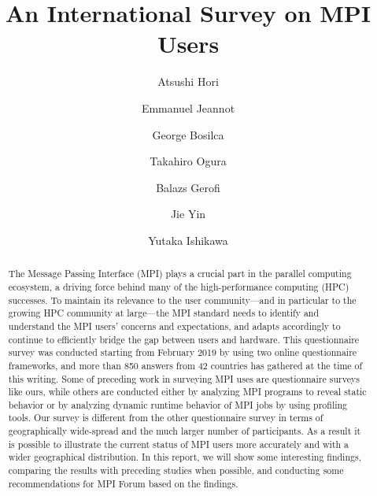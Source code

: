 \documentclass[preprint,5p,times]{elsarticle}
\begin{document}
\title{An International Survey on MPI Users}


\author[1]{Atsushi Hori}
\author[2]{Emmanuel Jeannot}
\author[3]{George Bosilca}
\author[1]{Takahiro Ogura}
\author[1]{Balazs Gerofi}
\author[1]{Jie Yin}
\author[1]{Yutaka Ishikawa}


\begin{abstract}
  The Message Passing Interface (MPI) plays a crucial part in the
  parallel computing ecosystem, a driving force behind many of the
  high-performance computing (HPC) successes. To maintain its relevance
  to the user community---and in particular to the growing HPC community
  at large---the MPI standard needs to identify and understand the MPI
  users' concerns and expectations, and adapts
  accordingly to continue to efficiently bridge the gap between users
  and hardware. This questionnaire survey was conducted starting from
  February
  2019 by using two online questionnaire frameworks, and more than 850
  answers from 42 countries has gathered at the time of this writing.
  Some of preceding work in surveying MPI uses are questionnaire surveys
  like ours, while others are conducted either by analyzing MPI programs
  to reveal static behavior or by analyzing dynamic runtime behavior of
  MPI jobs by using profiling tools. Our survey is different from the
  other questionnaire survey in terms of geographically wide-spread and
  the much larger number of participants. As a result it is possible to
  illustrate the current status of MPI users more accurately and with a
  wider geographical distribution. In this report, we will show some
  interesting findings, comparing the results with preceding studies
  when possible, and conducting some recommendations for MPI Forum
  based on the findings.
\end{abstract}
\end{document}

